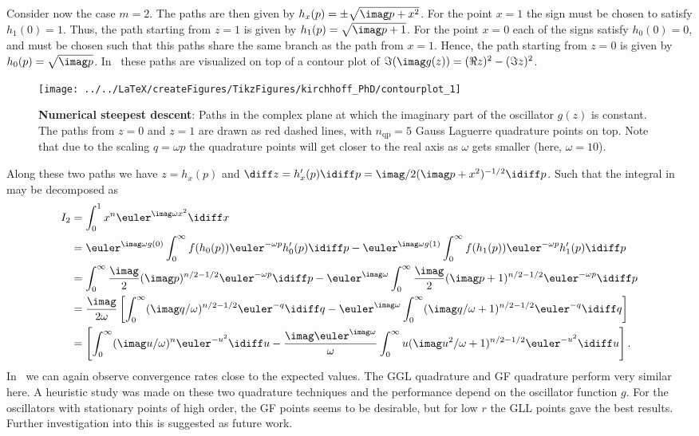 Consider now the case $m=2$. The paths are then given by $h_x(p) = \pm\sqrt{\imag p + x^2}$. For the point $x=1$ the sign must be chosen to satisfy $h_1(0) = 1$. Thus, the path starting from $z=1$ is given by $h_1(p) = \sqrt{\imag p + 1}$. For the point $x=0$ each of the signs satisfy $h_0(0) = 0$, and must be chosen such that this paths share the same branch as the path from $x=1$. Hence, the path starting from $z=0$ is given by $h_0(p) = \sqrt{\imag p}$. In~ these paths are visualized on top of a contour plot of $\Im(\imag g(z)) = (\Re z)^2-(\Im z)^2$.
\begin{figure}
	\centering
	\texttt{[image: ../../LaTeX/createFigures/TikzFigures/kirchhoff\_PhD/contourplot\_1]}
	\caption{\textbf{Numerical steepest descent}: Paths in the complex plane at which the imaginary part of the oscillator $g(z)$ is constant. The paths from $z=0$ and $z=1$ are drawn as red dashed lines, with $n_{\mathrm{qp}}=5$ Gauss Laguerre quadrature points on top. Note that due to the scaling $q=\omega p$ the quadrature points will get closer to the real axis as $\omega$ gets smaller (here, $\omega=10$).}
	\label{Fig4:paths}
\end{figure}
Along these two paths we have $z=h_x(p)$ and $\diff z=h_x'(p)\idiff p=\imag/2(\imag p+x^2)^{-1/2}\idiff p$. Such that the integral in~ may be decomposed as
\begin{align*}
	I_2 &= \int_0^1 x^n \euler^{\imag \omega x^2}\idiff x \\
	  &= \euler^{\imag\omega g(0)}\int_0^\infty f(h_0(p))\euler^{-\omega p}h_0'(p)\idiff p - \euler^{\imag\omega g(1)}\int_0^\infty f(h_1(p))\euler^{-\omega p}h_1'(p)\idiff p\\
	  &= \int_0^\infty \frac{\imag}{2}(\imag p)^{n/2-1/2}\euler^{-\omega p}\idiff p - \euler^{\imag\omega}\int_0^\infty \frac{\imag}{2}(\imag p+1)^{n/2-1/2}\euler^{-\omega p}\idiff p\\
	  &= \frac{\imag}{2\omega}\left[\int_0^\infty (\imag q/\omega)^{n/2-1/2}\euler^{-q}\idiff q - \euler^{\imag\omega}\int_0^\infty (\imag q/\omega+1)^{n/2-1/2}\euler^{-q}\idiff q\right]\\
	  &= \left[\int_0^\infty (\imag u/\omega)^n\euler^{-u^2}\idiff u - \frac{\imag\euler^{\imag\omega}}{\omega}\int_0^\infty u(\imag u^2/\omega+1)^{n/2-1/2}\euler^{-u^2}\idiff u\right].
\end{align*}
In~ we can again observe convergence rates close to the expected values. The GGL quadrature and GF quadrature perform very similar here. A heuristic study was made on these two quadrature techniques and the performance depend on the oscillator function $g$. For the oscillators with stationary points of high order, the GF points seems to be desirable, but for low $r$ the GLL points gave the best results. Further investigation into this is suggested as future work.
